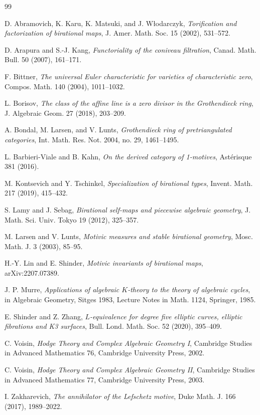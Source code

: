 \documentclass[11pt,a4paper]{article}
\begin{document}
\begin{thebibliography}{99}

D. Abramovich, K. Karu, K. Matsuki, and J. W\l odarczyk,
\emph{Torification and factorization of birational maps},
J. Amer. Math. Soc. 15 (2002), 531--572.

D. Arapura and S.-J. Kang,
\emph{Functoriality of the coniveau filtration},
Canad. Math. Bull. 50 (2007), 161--171.

F. Bittner,
\emph{The universal Euler characteristic for varieties of characteristic zero},
Compos. Math. 140 (2004), 1011--1032.

L. Borisov,
\emph{The class of the affine line is a zero divisor in the Grothendieck ring},
J. Algebraic Geom. 27 (2018), 203--209.

A. Bondal, M. Larsen, and V. Lunts,
\emph{Grothendieck ring of pretriangulated categories},
Int. Math. Res. Not. 2004, no. 29, 1461--1495.

L. Barbieri-Viale and B. Kahn,
\emph{On the derived category of 1-motives},
Ast\'erisque 381 (2016).

M. Kontsevich and Y. Tschinkel,
\emph{Specialization of birational types},
Invent. Math. 217 (2019), 415--432.

S. Lamy and J. Sebag,
\emph{Birational self-maps and piecewise algebraic geometry},
J. Math. Sci. Univ. Tokyo 19 (2012), 325--357.

M. Larsen and V. Lunts,
\emph{Motivic measures and stable birational geometry},
Mosc. Math. J. 3 (2003), 85--95.

H.-Y. Lin and E. Shinder,
\emph{Motivic invariants of birational maps},
arXiv:2207.07389.

J. P. Murre,
\emph{Applications of algebraic $K$-theory to the theory of algebraic cycles},
in Algebraic Geometry, Sitges 1983, Lecture Notes in Math. 1124, Springer, 1985.

E. Shinder and Z. Zhang,
\emph{$L$-equivalence for degree five elliptic curves, elliptic fibrations and K3 surfaces},
Bull. Lond. Math. Soc. 52 (2020), 395--409.

C. Voisin,
\emph{Hodge Theory and Complex Algebraic Geometry I},
Cambridge Studies in Advanced Mathematics 76, Cambridge University Press, 2002.

C. Voisin,
\emph{Hodge Theory and Complex Algebraic Geometry II},
Cambridge Studies in Advanced Mathematics 77, Cambridge University Press, 2003.

I. Zakharevich,
\emph{The annihilator of the Lefschetz motive},
Duke Math. J. 166 (2017), 1989--2022.

\end{thebibliography}
\end{document}
